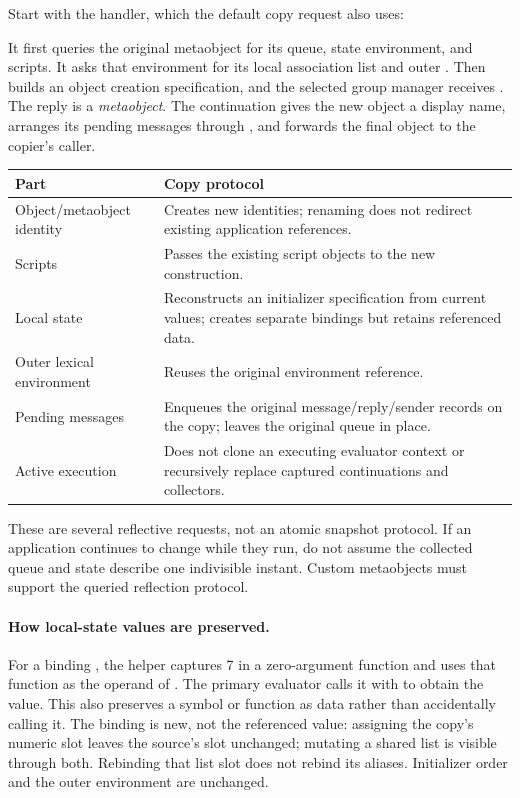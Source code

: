 Start with the  handler, which the default copy request
also uses:


It first queries the original metaobject for its queue, state environment,
and scripts. It asks that environment for its local association list and
outer . Then  builds an object
creation specification, and the selected group manager receives
. The reply is a \emph{metaobject}.
The continuation gives the new object a display name, arranges its pending
messages through , and forwards the final object
to the copier's caller.

\noindent\begin{minipage}{\linewidth}
\begin{longtable}{L{0.30\textwidth}L{0.60\textwidth}}
\textbf{Part} & \textbf{Copy protocol}\\\hline
Object/metaobject identity & Creates new identities; renaming does not redirect
existing application references.\\
Scripts & Passes the existing script objects to the new construction.\\
Local state & Reconstructs an initializer specification from current values;
creates separate bindings but retains referenced data.\\
Outer lexical environment & Reuses the original environment reference.\\
Pending messages & Enqueues the original message/reply/sender records on the
copy; leaves the original queue in place.\\
Active execution & Does not clone an executing evaluator context or
recursively replace captured continuations and collectors.\\
\end{longtable}
\end{minipage}

These are several reflective requests, not an atomic snapshot protocol.
If an application continues to change while they run, do not assume the
collected queue and state describe one indivisible instant.
Custom metaobjects must support the queried reflection protocol.

\paragraph{How local-state values are preserved.}
For a binding , the helper captures 7 in a zero-argument
function and uses that function as the operand of .
The primary evaluator calls it with  to obtain the value.
This also preserves a symbol or function as data rather than accidentally
calling it. The binding is new, not the referenced value: assigning the
copy's numeric slot leaves the source's slot unchanged; mutating a shared
list is visible through both. Rebinding that list slot does not rebind its
aliases. Initializer order and the outer environment are unchanged.

